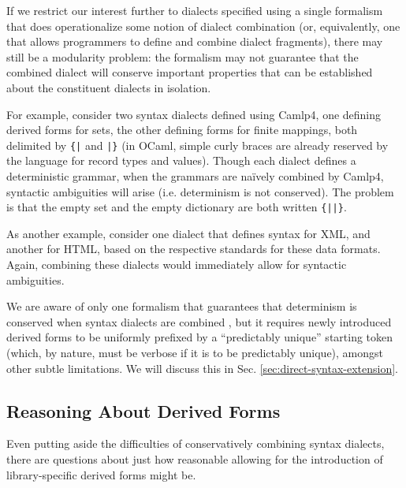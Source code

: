 If we restrict our interest further to dialects specified using a single formalism that does operationalize some notion of dialect combination (or, equivalently, one that allows programmers to define and combine dialect fragments), there may still be a modularity problem: the formalism may not guarantee that the combined dialect will conserve important properties that can be established about the constituent dialects in isolation. %

For example, consider two syntax dialects defined using Camlp4, one defining derived forms for sets, the other defining forms for finite mappings, both delimited by \verb~{|~ and \verb~|}~ (in OCaml, simple curly braces are already reserved by the language for record types and values). Though each dialect defines a deterministic grammar, when the grammars are na\"ively combined by Camlp4, syntactic ambiguities will arise (i.e. determinism is not conserved). The problem is that the empty set and the empty dictionary are both written \verb~{||}~. 

As another example, consider one dialect that defines syntax for XML, and another for HTML, based on the respective standards for these data formats. Again, combining these dialects would immediately allow for syntactic ambiguities.

We are aware of only one formalism that guarantees that determinism is conserved when syntax dialects are combined \cite{conf/pldi/SchwerdfegerW09}, but it requires newly introduced derived forms to be uniformly prefixed by a ``predictably unique'' starting token (which, by nature, must be verbose if it is to be predictably unique), amongst other subtle limitations. We will discuss this in Sec. \ref{sec:direct-syntax-extension}.

\subsection{Reasoning About Derived Forms}
Even putting aside the difficulties of conservatively combining syntax dialects, there are questions about just how reasonable allowing for the introduction of library-specific derived forms might be.

